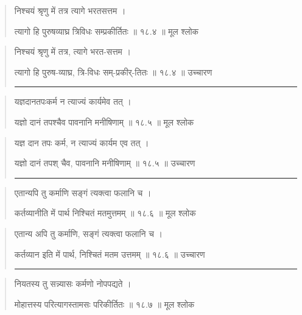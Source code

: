 \begin{quotation}

निश्चयं श्रृणु में तत्र त्यागे भरतसत्तम  ।  

त्यागो हि पुरुषव्याघ्र त्रिविधः सम्प्रकीर्तितः  ॥ १८.४ ॥  मूल श्लोक
\end{quotation}

\begin{quotation}

निश्चयं श्रृणु में तत्र, त्यागे भरत-सत्तम  ।  

त्यागो हि पुरुष-व्याघ्र, त्रि-विधः सम्-प्रकीर्-तितः  ॥ १८.४ ॥  उच्चारण

\noindent\rule{16cm}{0.4pt} 
\end{quotation}


\begin{quotation}

यज्ञदानतपःकर्म न त्याज्यं कार्यमेव तत्‌  ।  

यज्ञो दानं तपश्चैव पावनानि मनीषिणाम्‌  ॥ १८.५ ॥  मूल श्लोक
\end{quotation}

\begin{quotation}
यज्ञ दान तपः कर्म, न त्याज्यं कार्यम एव तत्‌  ।  

यज्ञो दानं तपश् चैव, पावनानि मनीषिणाम्‌  ॥ १८.५ ॥  उच्चारण

\noindent\rule{16cm}{0.4pt} 
\end{quotation}


\begin{quotation}

एतान्यपि तु कर्माणि सङ्‍गं त्यक्त्वा फलानि च  ।  

कर्तव्यानीति में पार्थ निश्चितं मतमुत्तमम्‌  ॥ १८.६ ॥  मूल श्लोक
\end{quotation}

\begin{quotation}

एतान्य अपि तु कर्माणि, सङ्‍गं त्यक्त्वा फलानि च  ।  

कर्तव्यान इति में पार्थ, निश्चितं मतम उत्तमम्‌  ॥ १८.६ ॥  उच्चारण

\noindent\rule{16cm}{0.4pt} 
\end{quotation}


\begin{quotation}

नियतस्य तु सन्न्यासः कर्मणो नोपपद्यते  ।  

मोहात्तस्य परित्यागस्तामसः परिकीर्तितः  ॥ १८.७ ॥  मूल श्लोक
\end{quotation}

